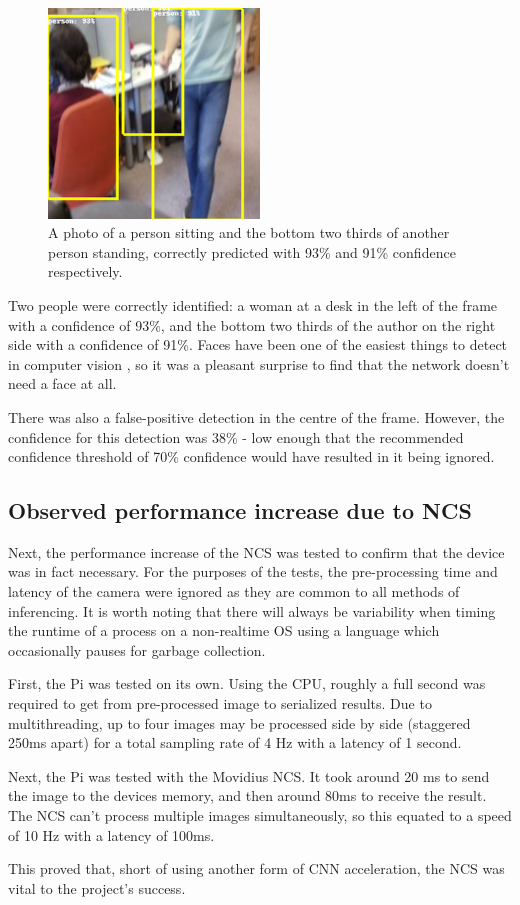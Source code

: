 \begin{figure}[h!]
  \centering
  \includegraphics[width=0.5\textwidth]{methodology/box_around_people_hard}
  \caption{{\label{fig:box_around_people_hard}A photo of a person sitting and the bottom two thirds of another person standing, correctly predicted with 93\% and 91\% confidence respectively.}}
\end{figure}

Two people were correctly identified: a woman at a desk in the left of the frame with a confidence of 93\%, and the bottom two thirds of the author on the right side with a confidence of 91\%. Faces have been one of the easiest things to detect in computer vision \cite{website:face_detection_survey}, so it was a pleasant surprise to find that the network doesn't need a face at all.

There was also a false-positive detection in the centre of the frame. However, the confidence for this detection was 38\% - low enough that the recommended confidence threshold of 70\% confidence \cite{website:chuanqi305_nn_github} would have resulted in it being ignored.%

\subsection{Observed performance increase due to NCS}\label{ssec:meth_nn_performance_increase}
Next, the performance increase of the NCS was tested to confirm that the device was in fact necessary. For the purposes of the tests, the pre-processing time and latency of the camera were ignored as they are common to all methods of inferencing. It is worth noting that there will always be variability when timing the runtime of a process on a non-realtime OS using a language which occasionally pauses for garbage collection.

First, the Pi was tested on its own. Using the CPU, roughly a full second was required to get from pre-processed image to serialized results. Due to multithreading, up to four images may be processed side by side (staggered 250ms apart) for a total sampling rate of 4 Hz with a latency of 1 second.

Next, the Pi was tested with the Movidius NCS. It took around 20 ms to send the image to the devices memory, and then around 80ms to receive the result. The NCS can't process multiple images simultaneously, so this equated to a speed of 10 Hz with a latency of 100ms.

This proved that, short of using another form of CNN acceleration, the NCS was vital to the project's success.

